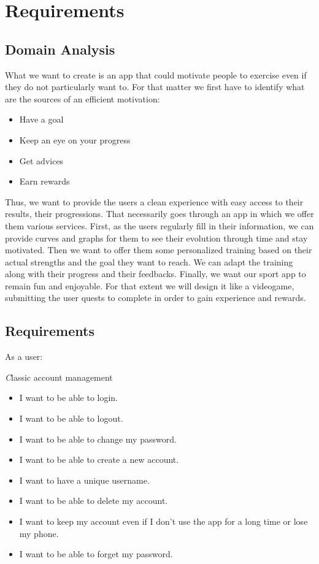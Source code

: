 \documentclass[conference]{IEEEtran}
\begin{document}
\section{Requirements}
\subsection{Domain Analysis}
What we want to create is an app that could motivate people to exercise even if they do not particularly want to. For that matter we first have to identify what are the sources of an efficient motivation: 
\begin{itemize}
\item Have a goal
\item Keep an eye on your progress
\item Get advices
\item Earn rewards
\end{itemize}
Thus, we want to provide the users a clean experience with easy access to their results, their progressions. That necessarily goes through an app in which we offer them various services. First, as the users regularly fill in their information, we can provide curves and graphs for them to see their evolution through time and stay motivated. Then we want to offer them some personalized training based on their actual strengths and the goal they want to reach. We can adapt the training along with their progress and their feedbacks. Finally, we want our sport app to remain fun and enjoyable. For that extent we will design it like a videogame, submitting the user quests to complete in order to gain experience and rewards.

\subsection{Requirements}
\begin{flushleft}
    \br
    As a user: 
\end{flushleft}
\begin{flushleft}
    \textit
    	Classic account management
\end{flushleft}
\begin{itemize}
\item I want to be able to login.
\item I want to be able to logout.
\item I want to be able to change my password.
\item I want to be able to create a new account.
\item I want to have a unique username.
\item I want to be able to delete my account. 
\item I want to keep my account even if I don't use the app for a long time or lose my phone.
\item I want to be able to forget my password.
\end{itemize}
\end{document}
